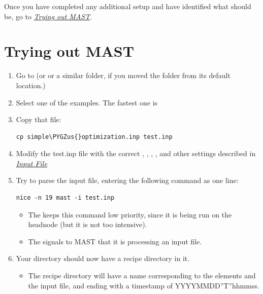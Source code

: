\documentclass[letterpaper,10pt,english]{sphinxmanual}
\def\PYGZus{\char`\_}
\begin{document}
Once you have completed any additional setup and have identified what  should be, go to {\hyperref[17_0_testmast::doc]{\emph{Trying out MAST}}}.


\chapter{Trying out MAST}
\label{17_0_testmast:trying-out-mast}\label{17_0_testmast::doc}\begin{enumerate}
\item {} 
Go to  (or  or a similar folder, if you moved the  folder from its default location.)

\item {} 
Select one of the examples. The fastest one is 

\item {} 
Copy that file:

\begin{Verbatim}[commandchars=\\\{\}]
cp simple\PYGZus{}optimization.inp test.inp
\end{Verbatim}

\item {} 
Modify the test.inp file with the correct , , , , and other settings described in {\hyperref[3_0_inputfile::doc]{\emph{Input File}}}

\item {} 
Try to parse the input file, entering the following command as one line:

\begin{Verbatim}[commandchars=\\\{\}]
nice -n 19 mast -i test.inp
\end{Verbatim}
\begin{itemize}
\item {} 
The  keeps this command low priority, since it is being run on the headnode (but it is not too intensive).

\item {} 
The  signals to MAST that it is processing an input file.

\end{itemize}

\item {} 
Your  directory should now have a recipe directory in it.
\begin{itemize}
\item {} 
The recipe directory will have a name corresponding to the elements and the input file, and ending with a timestamp of YYYYMMDD''T''hhmmss.


\end{itemize}
\end{enumerate}
\end{document}
